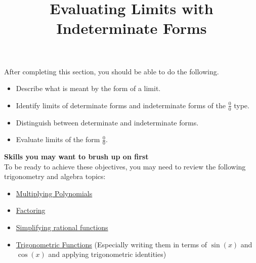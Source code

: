 \documentclass{ximera}
\title{Evaluating Limits with Indeterminate Forms}
\begin{document}
\begin{abstract}
\end{abstract}
\maketitle

\begin{sectionOutcomes}
After completing this section, you should be able to do the following.

\begin{itemize}
\item Describe what is meant by the form of a limit.
\item Identify limits of determinate forms and indeterminate forms of the $\frac{0}{0}$ type.
\item Distinguish between determinate and indeterminate forms.
\item Evaluate limits of the form $\frac{0}{0}$.
\end{itemize}
\end{sectionOutcomes}

\phantom{text}%


\textbf{Skills you may want to brush up on first} \\ To be ready to achieve these objectives, you may need to review the following trigonometry and algebra topics: 
\begin{itemize}
    \item \href{https://ximera.osu.edu/math160fa17/m160prerequisites/PreRequisiteXards/U6MultiplyingAndFactoringPolynomials/6.1MultiplyingPolynomials/6.1TitlePage/6.1TitlePage}{Multiplying Polynomials}
    \item \href{https://ximera.osu.edu/math160fa17/m160prerequisites/PreRequisiteXards/U6MultiplyingAndFactoringPolynomials/6.2FactoringPolynomials/titlePage}{Factoring}
    \item \href{https://ximera.osu.edu/math160fa17/m160prerequisites/PreRequisiteXards/U6MultiplyingAndFactoringPolynomials/6.3SimplifyingRationalFunctions/titlePage}{Simplifying rational functions}
    \item \href{https://ximera.osu.edu/math160fa17/m160prerequisites/PreRequisiteXards/U6MultiplyingAndFactoringPolynomials/6.3SimplifyingRationalFunctions/titlePage}{Trigonometric Functions} (Especially writing them in terms of $\sin(x)$ and $\cos(x)$ and applying trigonometric identities)
\end{itemize}
\end{document}
